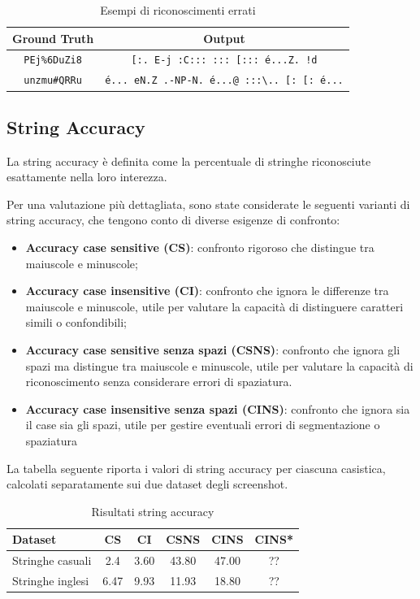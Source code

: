 \begin{table}[htbp]
    \centering
    \begin{tabular}{|c|c|}
        \hline
        \textbf{Ground Truth} & \textbf{Output} \\
        \hline
        \texttt{PEj\%6DuZi8} & \texttt{[:.\ E-j\ :C:::\ :::\ [:::\ é...Z.\ !d} \\
        \hline
        \texttt{unzmu\#QRRu} & \texttt{é...\ eN.Z\ .-NP-N.\ é...@\ :::\textbackslash..\ [:\ [:\ é...} \\
        \hline
    \end{tabular}
    \caption{Esempi di riconoscimenti errati}
    \label{tab:recognition_examples}
\end{table}

\subsection*{String Accuracy}
La string accuracy è definita come la percentuale di stringhe riconosciute esattamente nella loro interezza.

Per una valutazione più dettagliata, sono state considerate le seguenti varianti di string accuracy, che tengono conto di diverse esigenze di confronto:

\begin{itemize}
    \item \textbf{Accuracy case sensitive (CS)}: confronto rigoroso che distingue tra maiuscole e minuscole;
    \item \textbf{Accuracy case insensitive (CI)}: confronto che ignora le differenze tra maiuscole e minuscole, utile per valutare la capacità di distinguere caratteri simili o confondibili;
    \item \textbf{Accuracy case sensitive senza spazi (CSNS)}: confronto che ignora gli spazi ma distingue tra maiuscole e minuscole, utile per valutare la capacità di riconoscimento senza considerare errori di spaziatura.
    \item \textbf{Accuracy case insensitive senza spazi (CINS)}: confronto che ignora sia il case sia gli spazi, utile per gestire eventuali errori di segmentazione o spaziatura

\end{itemize}

La tabella seguente riporta i valori di string accuracy per ciascuna casistica, calcolati separatamente sui due dataset degli screenshot.

\begin{table}[htbp]
    \centering
    \begin{tabular}{lccccc}
        \toprule
        Dataset & CS & CI & CSNS & CINS & CINS* \\
        \midrule
        Stringhe casuali & 2.4 & 3.60 & 43.80 & 47.00 & ?? \\
        Stringhe inglesi & 6.47 & 9.93 & 11.93 & 18.80 & ?? \\
        \bottomrule
    \end{tabular}
    \caption{Risultati string accuracy}
    \label{tab:string_accuracy_stats}
\end{table}


